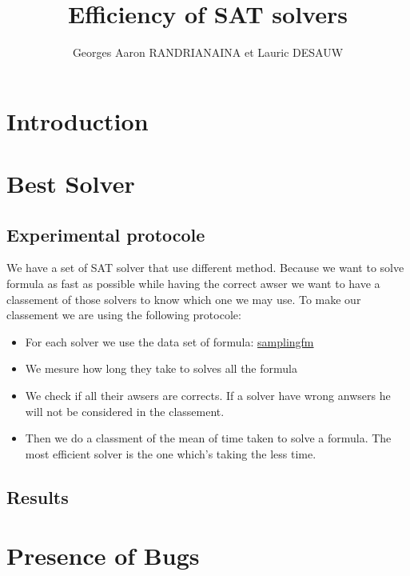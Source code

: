 \documentclass{article}
\title{Efficiency of SAT solvers}
\author{Georges Aaron RANDRIANAINA et Lauric DESAUW}
\begin{document}
\maketitle

\section{Introduction}


\section{Best Solver}
\subsection{Experimental protocole}
We have a set of SAT solver that use different method. Because we want to solve formula as fast as possible while having the correct awser we want to have a classement of those solvers to know which one we may use. To make our classement we are using the following protocole:

\begin{itemize}
\item For each solver we use the data set of formula: \href{https://github.com/diverse-project/samplingfm/tree/master/Benchmarks}{samplingfm}
\item We mesure how long they take to solves all the formula
\item We check if all their awsers are corrects. If a solver have wrong anwsers he will not be considered in the classement. 
\item  Then we do a classment of the mean of time taken to solve a formula. The most efficient solver is the one which's taking the less time. 
\end{itemize}
\subsection{Results}


\section{Presence of Bugs}
\end{document}
